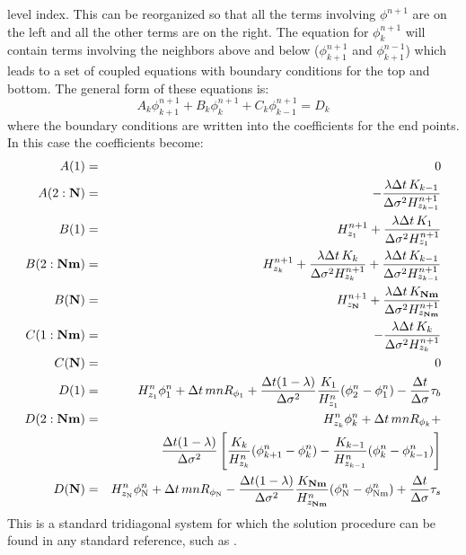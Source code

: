 level index.  This can be reorganized so that all the terms involving
$\phi^{n+1}$ are on the left and all the other terms are on the right.
The equation for $\phi_k^{n+1}$ will contain terms involving the neighbors
above and below ($\phi_{k+1}^{n+1}$ and $\phi_{k+1}^{n-1}$) which leads
to a set of coupled equations with boundary conditions for the top
and bottom.  The general form of these equations is: \begin{equation}
   A_k \phi_{k+1}^{n+1} + B_k \phi_k^{n+1} + C_k \phi_{k-1}^{n+1} = D_k
\end{equation} where the boundary conditions are written into the
coefficients for the end points.  In this case the coefficients become:
\begin{eqnarray}
   A(1) & = & 0 \\ A(2:{\bf N}) & = & - {\lambda \Delta t \, K_{k-1}
   \over \Delta \sigma^2 H^{n+1}_{z_{k-1}} } \\ B(1) & = & H^{n+1}_{z_1}
   + {\lambda \Delta t \, K_1 \over \Delta \sigma^2 H^{n+1}_{z_1} } \\
   B(2:{\bf Nm}) & = & H_{z_k}^{n+1} + {\lambda \Delta t \, K_k \over
   \Delta \sigma^2 H_{z_k}^{n+1} } + {\lambda \Delta t \, K_{k-1} \over
   \Delta \sigma^2 H^{n+1}_{z_{k-1}}}\\ B({\bf N}) & = & H^{n+1}_{z_{\bf
   N}} + {\lambda \Delta t \, K_{\bf Nm} \over
       \Delta \sigma^2 H^{n+1}_{z_{\bf Nm}} } \\
   C(1:{\bf Nm}) & = & - {\lambda \Delta t \, K_k \over \Delta \sigma^2
   H_{z_k}^{n+1} } \\ C({\bf N}) & = & 0 \\ D(1) & = & H^n_{z_1} \phi_1^n
   + \Delta t \, mn R_{{\phi}_1} + {\Delta t (1-\lambda) \over \Delta
   \sigma^2 }{ K_1 \over H^n_{z_1}} (\phi_2^n - \phi_1^n) - {\Delta t
   \over \Delta \sigma} \tau_b \\ D(2:{\bf Nm}) & = & H^n_{z_k} \phi_k^n +
   \Delta t \, mn R_{{\phi}_k} + \\ && {\Delta t (1-\lambda) \over \Delta
   \sigma^2 } \left[ { K_k \over H^n_{z_k}} (\phi_{k+1}^n - \phi_k^n)
   - { K_{k-1} \over H^n_{z_{k-1}}} (\phi_k^n - \phi_{k-1}^n) \right]
   \\ D({\bf N}) & = & H^n_{z_{\rm N}} \phi_{\rm N}^n + \Delta t \, mn
   R_{{\phi}_{\rm N}} - {\Delta t (1-\lambda) \over \Delta \sigma^2 } {
   K_{\bf Nm} \over H^n_{z_{\bf Nm}}} (\phi_{\rm N}^n - \phi_{\rm Nm}^n)
   + {\Delta t \over \Delta \sigma} \tau_s
\end{eqnarray} This is a standard tridiagonal system for which the
solution procedure can be found in any standard reference, such as
\cite{PFTV}.

